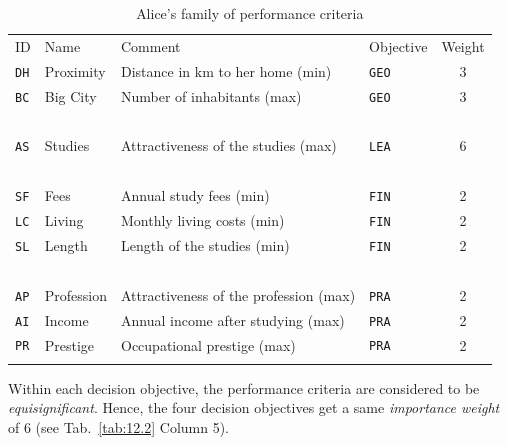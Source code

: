 \begin{table}[ht]
\caption{Alice's family of performance criteria}
\label{tab:12.2}       %
\begin{center}
    \begin{tabular}{l|l|l|l|c}
      \svhline\noalign{\smallskip}
      ID & Name & Comment & Objective & Weight\\
      \noalign{\smallskip}\hline\noalign{\smallskip}
       \texttt{DH}  & Proximity  &  Distance in km to her home (min)      &   \texttt{GEO}    &     3\\
       \texttt{BC}  & Big City   &  Number of inhabitants (max)           &   \texttt{GEO}    &     3\\
       \   & \          &  \                                     &   \      &     \ \\
       \texttt{AS}  & Studies    &  Attractiveness of the studies (max)   &   \texttt{LEA}    &     6\\
       \   & \          &  \                                     &  \       &    \ \\
       \texttt{SF}  & Fees       &  Annual study fees (min)               &   \texttt{FIN}    &     2\\
       \texttt{LC}  & Living     &  Monthly living costs (min)            &   \texttt{FIN}    &     2\\
       \texttt{SL}  & Length     &  Length of the studies (min)           &   \texttt{FIN}    &     2\\
       \   &  \         &   \                                    &   \      &     \ \\
       \texttt{AP}  & Profession &  Attractiveness of the profession (max)&   \texttt{PRA}    &     2\\
       \texttt{AI}  & Income     &  Annual income after studying (max)    &   \texttt{PRA}    &     2\\
       \texttt{PR}  & Prestige   &  Occupational prestige (max)           &   \texttt{PRA}    &     2\\
      \noalign{\smallskip}\hline
    \end{tabular}
\end{center}
\end{table}

Within each decision objective, the performance criteria are considered to be \emph{equisignificant}. Hence, the four decision objectives get a same \emph{importance weight} of $6$ (see Tab.~\vref{tab:12.2} Column 5).

